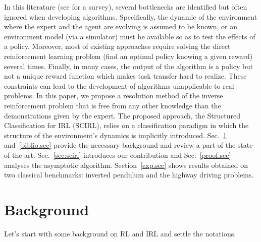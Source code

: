 \documentclass[tablecaption=bottom]{jmlr}
\begin{document}
In this literature (see \cite{neu2009training} for a survey),
several bottlenecks are identified but often ignored when developing
algorithms. Specifically, the dynamic of the environment where the
expert and the agent are evolving is assumed to be known, or an
environment model (via a simulator) must be available so as to test
the effects of a policy. Moreover, most of existing approaches
require solving the direct reinforcement learning problem (find an
optimal policy knowing a given reward) several times. Finally, in
many cases, the output of the algorithm is a policy but not a unique
reward function which makes task transfer hard to realize. These
constraints can lead to the development of algorithms unapplicable
to real problems.
%
In this paper, we propose a resolution method of the inverse
reinforcement problem that is free from any other knowledge than the
demonstrations given by the expert. The proposed approach, the
Structured Classification for IRL (SCIRL), relies on a
classification paradigm in which the structure of the environment's
dynamics is implicitly introduced. Sec.~\ref{back.sec}
and~\ref{biblio.sec} provide the necessary background and review a
part of the state of the art. Sec.~\ref{sec:scirl} introduces our
contribution and Sec.~\ref{proof.sec} analyses the asymptotic
algorithm. Section~\ref{exp.sec} shows results obtained on two
classical benchmarks: inverted pendulum and the highway driving
problems.
%


\section{Background}
\label{back.sec}
Let's start with some background on RL and IRL and settle the
notations.
\end{document}
